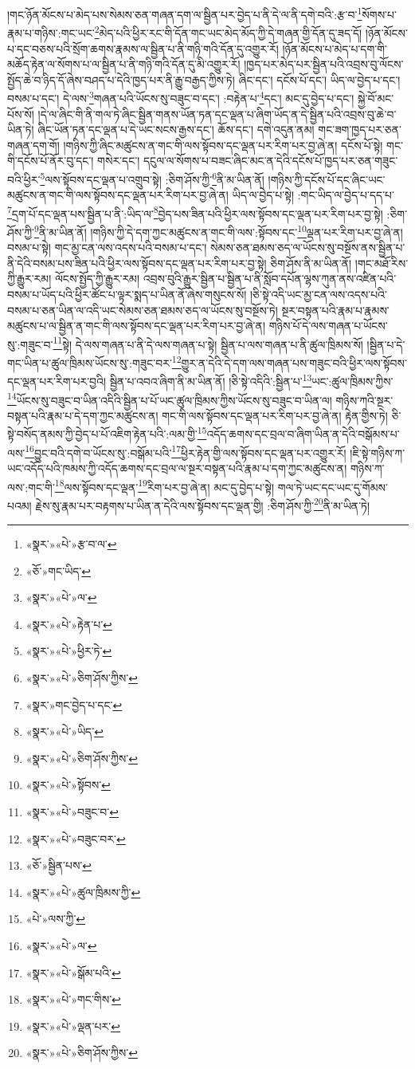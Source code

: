།གང་ཉོན་མོངས་པ་མེད་པས་སེམས་ཅན་གཞན་དག་ལ་སྦྱིན་པར་བྱེད་པ་ནི་དེ་ལ་ནི་དགེ་བའི་:རྩ་བ་\footnote{«སྣར་»«པེ་»རྩ་བ་ལ་}སོགས་པ་རྣམ་པ་གཉིས་:གང་ཡང་\footnote{«ཅོ་»གང་ཡིད་}མེད་པའི་ཕྱིར་རང་གི་དོན་གང་ཡང་མེད་མོད་ཀྱི་དེ་གཞན་གྱི་དོན་དུ་ཟད་དོ། །ཉོན་མོངས་པ་དང་བཅས་པའི་སྲོག་ཆགས་རྣམས་ལ་སྦྱིན་པ་ནི་གཉི་གའི་དོན་དུ་འགྱུར་རོ། །ཉོན་མོངས་པ་མེད་པ་དག་གི་མཆོད་རྟེན་ལ་སོགས་པ་ལ་སྦྱིན་པ་ནི་གཉི་གའི་དོན་དུ་མི་འགྱུར་རོ། །ཁྱད་པར་མེད་པར་སྦྱིན་པའི་འབྲས་བུ་ལོངས་སྤྱོད་ཆེ་བ་ཉིད་དོ་ཞེས་བཤད་པ་དེའི་ཁྱད་པར་ནི་རྒྱུ་བརྒྱད་ཀྱིས་ཏེ། ཞིང་དང་། དངོས་པོ་དང་། ཡིད་ལ་བྱེད་པ་དང་། བསམ་པ་དང་། དེ་ལས་\footnote{«སྣར་»«པེ་»ལ་}གཞན་པའི་ཡོངས་སུ་བཟུང་བ་དང་། :བརྟེན་པ་\footnote{«སྣར་»«པེ་»རྟེན་པ་}དང་། མང་དུ་བྱེད་པ་དང་། སྐྱེ་བོ་མང་པོས་སོ། །དེ་ལ་ཞིང་གི་ནི་གལ་ཏེ་ཞིང་སྦྱིན་གནས་ཡོན་ཏན་དང་ལྡན་པ་ཞིག་ཡོད་ན་དེ་སྦྱིན་པའི་འབྲས་བུ་ཆེ་བ་ཡིན་ཏེ། ཞིང་ཡོན་ཏན་དང་ལྡན་པ་དེ་ཡང་སངས་རྒྱས་དང་། ཆོས་དང་། དགེ་འདུན་ནམ། གང་ཟག་ཁྱད་པར་ཅན་གཞན་དག་གོ། །གཉིས་ཀྱི་ཞིང་མཚུངས་ན་གང་གི་ལས་སྟོབས་དང་ལྡན་པར་རིག་པར་བྱ་ཞེ་ན། དངོས་པོ་སྟེ། གང་གི་དངོས་པོ་ནོར་བུ་དང་། གསེར་དང་། དངུལ་ལ་སོགས་པ་བཟང་ཞིང་མང་ན་དེའི་དངོས་པོ་ཁྱད་པར་ཅན་གཟུང་བའི་ཕྱིར་\footnote{«སྣར་»«པེ་»ཕྱིར་ཏེ་}ལས་སྟོབས་དང་ལྡན་པ་འགྲུབ་སྟེ། :ཅིག་ཤོས་ཀྱི་\footnote{«སྣར་»«པེ་»ཅིག་ཤོས་ཀྱིས་}ནི་མ་ཡིན་ནོ། །གཉིས་ཀྱི་དངོས་པོ་དང་ཞིང་ཡང་མཚུངས་ན་གང་གི་ལས་སྟོབས་དང་ལྡན་པར་རིག་པར་བྱ་ཞེ་ན། ཡིད་ལ་བྱེད་པ་སྟེ། :གང་ཡིད་ལ་བྱེད་པ་དད་པ་\footnote{«སྣར་»གང་བྱེད་པ་དང་}དྲག་པོ་དང་ལྡན་པས་སྦྱིན་པ་ནི་:ཡིད་ལ་\footnote{«སྣར་»«པེ་»ཡིད་}བྱེད་པས་ཟིན་པའི་ཕྱིར་ལས་སྟོབས་དང་ལྡན་པར་རིག་པར་བྱ་སྟེ། :ཅིག་ཤོས་ཀྱི་\footnote{«སྣར་»«པེ་»ཅིག་ཤོས་ཀྱིས་}ནི་མ་ཡིན་ནོ། །གཉིས་ཀྱི་དེ་དག་ཀྱང་མཚུངས་ན་གང་གི་ལས་:སྟོབས་དང་\footnote{«སྣར་»«པེ་»སྟོབས་}ལྡན་པར་རིག་པར་བྱ་ཞེ་ན། བསམ་པ་སྟེ། གང་མྱ་ངན་ལས་འདས་པའི་བསམ་པ་དང་། སེམས་ཅན་ཐམས་ཅད་ལ་ཡོངས་སུ་བསྔོས་ནས་སྦྱིན་པ་ནི་དེའི་བསམ་པས་ཟིན་པའི་ཕྱིར་ལས་སྟོབས་དང་ལྡན་པར་རིག་པར་བྱ་སྟེ། ཅིག་ཤོས་ནི་མ་ཡིན་ནོ། །གང་མཐོ་རིས་ཀྱི་རྒྱུར་རམ། ལོངས་སྤྱོད་ཀྱི་རྒྱུར་རམ། འབྲས་བུའི་རྒྱུར་སྦྱིན་པ་སྦྱིན་པ་ནི་སློབ་དཔོན་ལྷས་ཀུན་ནས་འཛིན་པའི་བསམ་པ་ཡོད་པའི་ཕྱིར་ཚོང་པ་ལྟར་སྨད་པ་ཡིན་ནོ་ཞེས་གསུངས་སོ། །ཅི་སྟེ་འདི་ཡང་མྱ་ངན་ལས་འདས་པའི་བསམ་པ་ཅན་ཡིན་ལ་འདི་ཡང་སེམས་ཅན་ཐམས་ཅད་ལ་ཡོངས་སུ་བསྔོས་ཏེ། སྔར་བསྟན་པའི་རྣམ་པ་རྣམས་མཚུངས་པ་ལ་སྦྱིན་ན་གང་གི་ལས་སྟོབས་དང་ལྡན་པར་རིག་པར་བྱ་ཞེ་ན། གཉིས་པོ་དེ་ལས་གཞན་པ་ཡོངས་སུ་:གཟུང་བ་\footnote{«སྣར་»«པེ་»བཟུང་བ་}སྟེ། དེ་ལས་གཞན་པ་ནི་དེ་ལས་གཞན་པ་སྟེ། སྦྱིན་པ་ལས་གཞན་པ་ནི་ཚུལ་ཁྲིམས་སོ། །སྦྱིན་པ་དེ་གང་ཡིན་པ་ཚུལ་ཁྲིམས་ཡོངས་སུ་:གཟུང་བར་\footnote{«སྣར་»«པེ་»བཟུང་བར་}གྱུར་ན་དེའི་དེ་དག་ལས་གཞན་པས་གཟུང་བའི་ཕྱིར་ལས་སྟོབས་དང་ལྡན་པར་རིག་པར་བྱའི། སྦྱིན་པ་འབའ་ཞིག་ནི་མ་ཡིན་ནོ། །ཅི་སྟེ་འདིའི་:སྦྱིན་པ་\footnote{«ཅོ་»སྦྱིན་པས་}ཡང་:ཚུལ་ཁྲིམས་ཀྱིས་\footnote{«སྣར་»«པེ་»ཚུལ་ཁྲིམས་ཀྱི་}ཡོངས་སུ་བཟུང་བ་ཡིན་འདིའི་སྦྱིན་པ་པོ་ཡང་ཚུལ་ཁྲིམས་ཀྱིས་ཡོངས་སུ་བཟུང་བ་ཡིན་ལ། གཉིས་ཀའི་སྔར་བསྟན་པའི་རྣམ་པ་དེ་དག་ཀྱང་མཚུངས་ན། གང་གི་ལས་སྟོབས་དང་ལྡན་པར་རིག་པར་བྱ་ཞེ་ན། རྟེན་གྱིས་ཏེ། ཅི་སྟེ་བསོད་ནམས་ཀྱི་བྱེད་པ་པོ་འཇིག་རྟེན་པའི་:ལམ་གྱི་\footnote{«པེ་»ལས་ཀྱི་}འདོད་ཆགས་དང་བྲལ་བ་ཞིག་ཡིན་ན་དེའི་བསྒོམས་པ་ལས་\footnote{«སྣར་»«པེ་»ལ་}བྱུང་བའི་དགེ་བ་ཡོངས་སུ་:བསྒོམ་པའི་\footnote{«སྣར་»«པེ་»སྒོམ་པའི་}ཕྱིར་རྟེན་གྱི་ལས་སྟོབས་དང་ལྡན་པར་འགྱུར་རོ། །ཇི་སྟེ་གཉིས་ཀ་ཡང་འདོད་པའི་ཁམས་ཀྱི་འདོད་ཆགས་དང་བྲལ་ལ་སྔར་བསྟན་པའི་རྣམ་པ་དག་ཀྱང་མཚུངས་ན། གཉིས་ཀ་ལས་:གང་གི་\footnote{«སྣར་»«པེ་»གང་གིས་}ལས་སྟོབས་དང་ལྡན་\footnote{«སྣར་»«པེ་»ལྡན་པར་}རིག་པར་བྱ་ཞེ་ན། མང་དུ་བྱེད་པ་སྟེ། གལ་ཏེ་ཡང་དང་ཡང་དུ་གོམས་པའམ། རྗེས་སུ་རྣམ་པར་བརྟགས་པ་ཡིན་ན་དེའི་ལས་སྟོབས་དང་ལྡན་གྱི། :ཅིག་ཤོས་ཀྱི་\footnote{«སྣར་»«པེ་»ཅིག་ཤོས་ཀྱིས་}ནི་མ་ཡིན་ཏེ། 